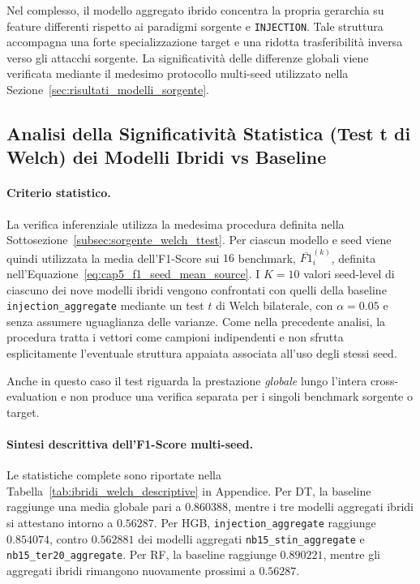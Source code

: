 Nel complesso, il modello aggregato ibrido concentra la propria gerarchia su feature differenti rispetto ai paradigmi sorgente e \texttt{INJECTION}.
Tale struttura accompagna una forte specializzazione target e una ridotta trasferibilità inversa verso gli attacchi sorgente. 
La significatività delle differenze globali viene verificata mediante il medesimo protocollo multi-seed utilizzato nella Sezione~\ref{sec:risultati_modelli_sorgente}.



\subsection{Analisi della Significatività Statistica (Test t di Welch) dei Modelli Ibridi vs Baseline}
\label{subsec:ibridi_welch_ttest}

\paragraph{Criterio statistico.}
La verifica inferenziale utilizza la medesima procedura definita nella Sottosezione~\ref{subsec:sorgente_welch_ttest}. 
Per ciascun modello e seed viene quindi utilizzata la media dell'F1-Score sui $16$ benchmark, $\overline{F1}_{i}^{(k)}$, definita nell'Equazione~\eqref{eq:cap5_f1_seed_mean_source}. 
I $K=10$ valori seed-level di ciascuno dei nove modelli ibridi vengono confrontati con quelli della baseline \texttt{injection\_aggregate} mediante un test $t$ di Welch bilaterale, con $\alpha=0.05$ e senza assumere uguaglianza delle varianze. Come nella precedente analisi, la procedura tratta i vettori come campioni indipendenti e non sfrutta esplicitamente l'eventuale struttura appaiata associata all'uso degli stessi seed.

Anche in questo caso il test riguarda la prestazione \emph{globale} lungo l'intera cross-evaluation e non produce una verifica separata per i singoli benchmark sorgente o target.

\paragraph{Sintesi descrittiva dell'F1-Score multi-seed.}
Le statistiche complete sono riportate nella Tabella~\ref{tab:ibridi_welch_descriptive} in Appendice. 
Per DT, la baseline raggiunge una media globale pari a $0.860388$, mentre i tre modelli aggregati ibridi si attestano intorno a $0.56287$. 
Per HGB, \texttt{injection\_aggregate} raggiunge $0.854074$, contro $0.562881$ dei modelli aggregati \texttt{nb15\_stin\_aggregate} e \newline \texttt{nb15\_ter20\_aggregate}. 
Per RF, la baseline raggiunge $0.890221$, mentre gli aggregati ibridi rimangono nuovamente prossimi a $0.56287$.

